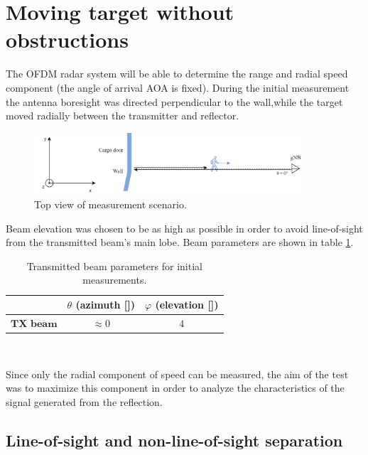 \section{Moving target without obstructions}

The OFDM radar system will be able to determine the range and radial speed component (the angle of arrival AOA is fixed). During the initial measurement the antenna boresight was directed perpendicular to the wall,while the target moved radially between the transmitter and reflector.

\begin{figure}[H]
	\centering
	\includegraphics[width=0.9\textwidth]{Images/Test1/base-top_view}
	\caption{Top view of measurement scenario.}
	\label{fig:Test1_base-top_view}
\end{figure}


Beam elevation was chosen to be as high as possible in order to avoid line-of-sight from the transmitted beam's main lobe. Beam parameters are shown in table \ref{table:Test1TXBeamParams}.


\begin{table}[H]
	\centering 
	\begin{tabular}{|p{9em} c c |}
		\hline
		\rowcolor{bluepoli!40} %
		\textbf{} & \textbf{$\theta$ (azimuth [\textdegree])} & \textbf{$\varphi$ (elevation [\textdegree])} \T\B \\
		\hline \hline
		$\textbf{TX beam}$ & $\approx 0$ & $4$ \T\B \\
		
		\hline
	\end{tabular}
	\\[10pt]
	\caption{Transmitted beam parameters for initial measurements.}
	\label{table:Test1TXBeamParams}
\end{table}

Since only the radial component of speed can be measured, the aim of the test was to maximize this component in order to analyze the characteristics of the signal generated from the reflection.

\subsection{Line-of-sight and non-line-of-sight separation}

